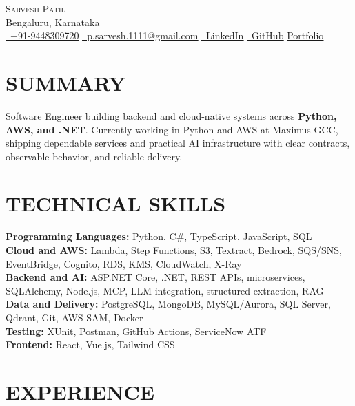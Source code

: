 \documentclass[letterpaper,10pt]{article}
\newcommand{\linked}[2]{\href{#1}{\underline{#2}}}
\begin{document}
\begin{center}
  {\Huge\scshape Sarvesh Patil}\\[-1pt]
  Bengaluru, Karnataka\\[3pt]
  \small
  \linked{tel:+91-9448309720}{\faPhone\ +91-9448309720}\quad
  \linked{mailto:p.sarvesh.1111@gmail.com}{\faEnvelope\ p.sarvesh.1111@gmail.com}\quad
  \linked{https://www.linkedin.com/in/patilsarvesh/}{\faLinkedin\ LinkedIn}\quad
  \linked{https://github.com/PatilSarvesh}{\faGithub\ GitHub}\quad
  \linked{https://sarvesh-patil.netlify.app/}{Portfolio}
\end{center}

\section{SUMMARY}
{\small Software Engineer building backend and cloud-native systems across \textbf{Python, AWS, and .NET}. Currently working in Python and AWS at Maximus GCC, shipping dependable services and practical AI infrastructure with clear contracts, observable behavior, and reliable delivery.}

\section{TECHNICAL SKILLS}
{\small
\textbf{Programming Languages:} Python, C\#, TypeScript, JavaScript, SQL\\
\textbf{Cloud and AWS:} Lambda, Step Functions, S3, Textract, Bedrock, SQS/SNS, EventBridge, Cognito, RDS, KMS, CloudWatch, X-Ray\\
\textbf{Backend and AI:} ASP.NET Core, .NET, REST APIs, microservices, SQLAlchemy, Node.js, MCP, LLM integration, structured extraction, RAG\\
\textbf{Data and Delivery:} PostgreSQL, MongoDB, MySQL/Aurora, SQL Server, Qdrant, Git, AWS SAM, Docker\\
\textbf{Testing:} XUnit, Postman, GitHub Actions, ServiceNow ATF\\
\textbf{Frontend:} React, Vue.js, Tailwind CSS
}

\section{EXPERIENCE}
\end{document}
